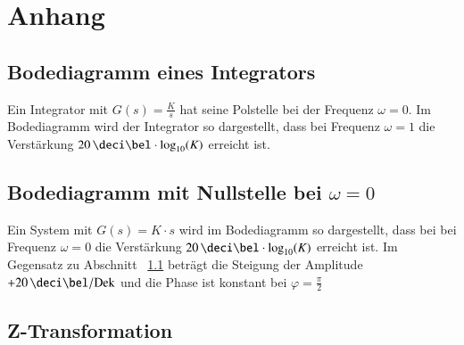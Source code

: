 \section{Anhang}

\subsection{Bodediagramm eines Integrators}
\label{Bodediagramm eines Integrators}

Ein Integrator mit $G(s) = \frac{K}{s}$ hat seine Polstelle bei der Frequenz $\omega = 0$. Im Bodediagramm wird der Integrator so
dargestellt, dass bei Frequenz $\omega = 1$ die Verstärkung $20 \, \deci \bel \cdot \log_{10}(K)$ erreicht ist.



\subsection[Bodediagramm mit Nullstelle bei omega = 0]{Bodediagramm mit Nullstelle bei $\omega = 0$}

Ein System mit $G(s) = K \cdot s$ wird im Bodediagramm so dargestellt, dass bei bei Frequenz $\omega = 0$ die Verstärkung
$20 \, \deci \bel \cdot \log_{10}(K)$ erreicht ist. Im Gegensatz zu Abschnitt ~\ref{Bodediagramm eines Integrators} beträgt die Steigung
der Amplitude $+20 \, \deci \bel / \mathrm{Dek}$ und die Phase ist konstant bei $\varphi = \frac{\pi}{2}$


\subsection{Z-Transformation}
\label{Z-Transformation}

